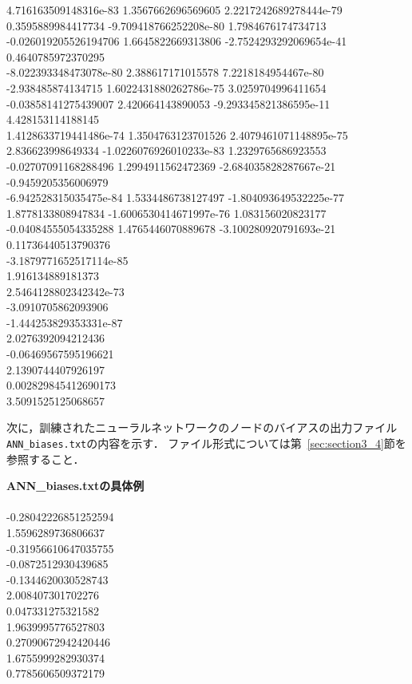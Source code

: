 \documentclass[11pt,titlepage,dvipdfmx,twoside]{jarticle}
\begin{document}
\begin{oframed}
4.716163509148316e-83 1.3567662696569605 2.2217242689278444e-79 0.3595889984417734 -9.709418766252208e-80 1.7984676174734713 -0.026019205526194706 1.6645822669313806 -2.7524293292069654e-41 0.4640785972370295   \\
-8.022393348473078e-80 2.388617171015578 7.2218184954467e-80 -2.938485874134715 1.6022431880262786e-75 3.0259704996411654 -0.03858141275439007 2.420664143890053 -9.293345821386595e-11 4.428153114188145   \\
1.4128633719441486e-74 1.3504763123701526 2.4079461071148895e-75 2.836623998649334 -1.0226076926010233e-83 1.2329765686923553 -0.02707091168288496 1.2994911562472369 -2.684035828287667e-21 -0.9459205356006979   \\
-6.942528315035475e-84 1.5334486738127497 -1.804093649532225e-77 1.8778133808947834 -1.6006530414671997e-76 1.083156020823177 -0.04084555054335288 1.4765446070889678 -3.100280920791693e-21 0.11736440513790376   \\
-3.1879771652517114e-85   \\
1.916134889181373   \\
2.5464128802342342e-73   \\
-3.0910705862093906   \\
-1.444253829353331e-87   \\
2.0276392094212436   \\
-0.06469567595196621   \\
2.1390744407926197   \\
0.002829845412690173   \\
3.5091525125068657  \\
\end{oframed}

\bigskip

次に，訓練されたニューラルネットワークのノードのバイアスの出力ファイル\verb|ANN_biases.txt|の内容を示す．
ファイル形式については第~\ref{sec:section3_4}節を参照すること．

\bigskip

\begin{oframed}
{\bf ANN\_biases.txtの具体例}\\\\
-0.28042226851252594 \\
1.5596289736806637 \\
-0.31956610647035755 \\
-0.0872512930439685 \\
-0.1344620030528743 \\
2.008407301702276 \\
0.047331275321582 \\
1.9639995776527803 \\
0.27090672942420446 \\
1.6755999282930374 \\
0.7785606509372179
\end{oframed}
\end{document}
